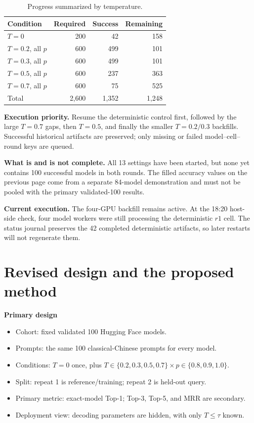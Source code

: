\documentclass[10pt,a4paper]{article}
\begin{document}
\begin{table}[h]
\centering
\small
\caption{Progress summarized by temperature.}
\begin{tabular}{lrrr}
\toprule
Condition & Required & Success & Remaining \\
\midrule
$T=0$ & 200 & 42 & 158 \\
$T=0.2$, all $p$ & 600 & 499 & 101 \\
$T=0.3$, all $p$ & 600 & 499 & 101 \\
$T=0.5$, all $p$ & 600 & 237 & 363 \\
$T=0.7$, all $p$ & 600 & 75 & 525 \\
\midrule
Total & 2,600 & 1,352 & 1,248 \\
\bottomrule
\end{tabular}
\end{table}

\textbf{Execution priority.}
Resume the deterministic control first, followed by the large $T=0.7$ gaps,
then $T=0.5$, and finally the smaller $T=0.2/0.3$ backfills. Successful
historical artifacts are preserved; only missing or failed model--cell--round
keys are queued.

\textbf{What is and is not complete.}
All 13 settings have been started, but none yet contains 100 successful models
in both rounds. The filled accuracy values on the previous page come from a
separate 84-model demonstration and must not be pooled with the primary
validated-100 results.

\textbf{Current execution.}
The four-GPU backfill remains active. At the 18:20 host-side check, four model
workers were still processing the deterministic $r1$ cell. The status journal
preserves the 42 completed deterministic artifacts, so later restarts will not
regenerate them.

\clearpage
\section{Revised design and the proposed method}

\textbf{Primary design}

\begin{itemize}
  \item Cohort: fixed validated 100 Hugging Face models.
  \item Prompts: the same 100 classical-Chinese prompts for every model.
  \item Conditions: $T=0$ once, plus
        $T\in\{0.2,0.3,0.5,0.7\}\times p\in\{0.8,0.9,1.0\}$.
  \item Split: repeat 1 is reference/training; repeat 2 is held-out query.
  \item Primary metric: exact-model Top-1; Top-3, Top-5, and MRR are secondary.
  \item Deployment view: decoding parameters are hidden, with only
        $T\leq\tau$ known.
\end{itemize}
\end{document}
